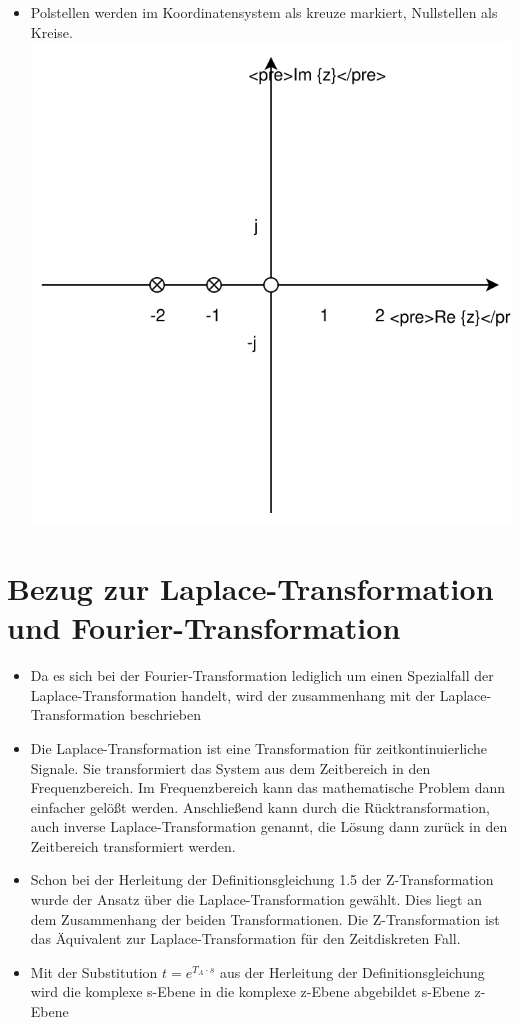 \documentclass[11pt]{article}
\makeatletter
\def\maxwidth{\ifdim\Gin@nat@width>\linewidth\linewidth
    \else\Gin@nat@width\fi}
\let\Oldincludegraphics\includegraphics
\renewcommand{\includegraphics}[1]{\Oldincludegraphics[width=.8\maxwidth]{#1}}
\providecommand{\tightlist}{%
      \setlength{\itemsep}{0pt}\setlength{\parskip}{0pt}}
\makeatother
\begin{document}
\begin{itemize}
\tightlist
\item
  Polstellen werden im Koordinatensystem als kreuze markiert,
  Nullstellen als Kreise. \includegraphics{Pol_Null_S.svg}
\end{itemize}

    \section{Bezug zur Laplace-Transformation und
Fourier-Transformation}\label{bezug-zur-laplace-transformation-und-fourier-transformation}

\begin{itemize}
\item
  Da es sich bei der Fourier-Transformation lediglich um einen
  Spezialfall der Laplace-Transformation handelt, wird der zusammenhang
  mit der Laplace-Transformation beschrieben
\item
  Die Laplace-Transformation ist eine Transformation für
  zeitkontinuierliche Signale. Sie transformiert das System aus dem
  Zeitbereich in den Frequenzbereich. Im Frequenzbereich kann das
  mathematische Problem dann einfacher gelößt werden. Anschließend kann
  durch die Rücktransformation, auch inverse Laplace-Transformation
  genannt, die Lösung dann zurück in den Zeitbereich transformiert
  werden.
\item
  Schon bei der Herleitung der Definitionsgleichung 1.5 der
  Z-Transformation wurde der Ansatz über die Laplace-Transformation
  gewählt. Dies liegt an dem Zusammenhang der beiden Transformationen.
  Die Z-Transformation ist das Äquivalent zur Laplace-Transformation für
  den Zeitdiskreten Fall.
\item
  Mit der Substitution \(t = e^{T_A \cdot s}\) aus der Herleitung der
  Definitionsgleichung wird die komplexe s-Ebene in die komplexe z-Ebene
  abgebildet s-Ebene z-Ebene
\end{itemize}
\end{document}
